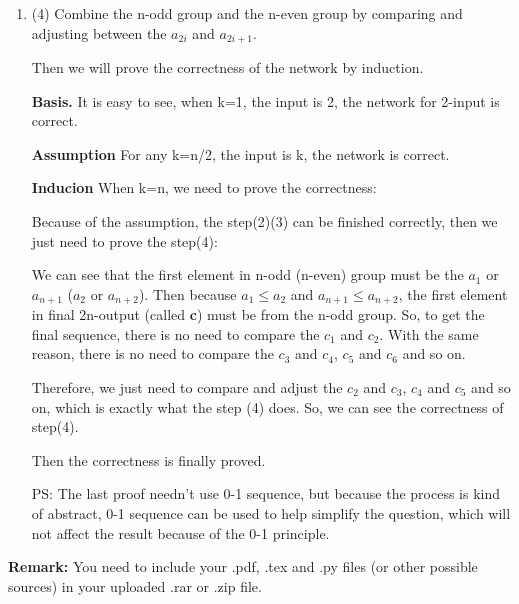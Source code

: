 \documentclass[12pt,a4paper]{article}
\makeatletter
\newtheorem*{solution}{Solution}
\theoremstyle{definition}
\renewenvironment{solution}[1][Solution] {\par\pushQED{\qed}\normalfont\topsep6\p@\@plus6\p@\relax\trivlist\item[\hskip\labelsep\bfseries#1\@addpunct{.}]\ignorespaces}{\popQED\endtrivlist\@endpefalse} \makeatother
\makeatother
\begin{document}
\begin{enumerate}
\begin{solution}
	(4) Combine the n-odd group and the n-even group by comparing and adjusting between the $a_{2i}$ and $a_{2i+1}$.
	
	Then we will prove the correctness of the network by induction.	

	
   \textbf{Basis.} It is easy to see, when k=1, the input is 2, the network for 2-input is correct.
   
	\textbf{Assumption} For any k=n/2, the input is k, the network is correct.
	
	\textbf{Inducion} When k=n, we need to prove the correctness:
	  
	  Because of the assumption, the step(2)(3) can be finished correctly, then we just need to prove the step(4):
	  
		We can see that the first element in n-odd (n-even) group must be the $a_1$ or $a_{n+1}$ ($a_2$ or $a_{n+2}$). Then because $a_1\leq a_2$ and $a_{n+1}\leq a_{n+2}$, the first element in final 2n-output (called \textbf{c}) must be from the n-odd group. So, to get the final sequence, there is no need to compare the $c_1$ and $c_2$. With the same reason, there is no need to compare the $c_3$ and $c_4$, $c_5$ and $c_6$ and so on.
	
	Therefore, we just need to compare and adjust the $c_2$ and $c_3$, $c_4$ and $c_5$ and so on, which is exactly what the step (4) does. So, we can see the correctness of step(4). 
	 
	
	Then the correctness is finally proved. 
	
	PS: The last proof needn't use 0-1 sequence, but because the process is kind of abstract, 0-1 sequence can be used to help simplify the question, which will not affect the result because of the 0-1 principle.
	
	\end{solution}
   


\end{enumerate}

\vspace{30pt}


\textbf{Remark:} You need to include your .pdf, .tex and .py files (or other possible sources) in your uploaded .rar or .zip file.

\end{document}
